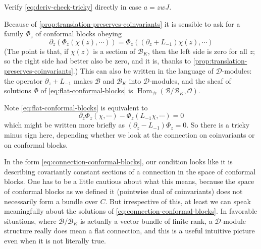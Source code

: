 \documentclass[12pt,letterpaper,reqno]{amsart}
\newcommand{\added}[1]{{\color{addedcolor}#1}}
\numberwithin{equation}{section}
\newcommand{\cD}{\ensuremath{\mathcal D}}
\newcommand{\cB}{\ensuremath{\mathcal B}}
\newcommand{\cO}{\ensuremath{\mathcal O}}
\DeclareMathOperator{\Hom}{Hom}
\begin{document}
\begin{exercise}
Verify \eqref{eq:deriv-check-tricky} directly
in case $a = z w J$.
\end{exercise}

Because of \autoref{prop:translation-preserves-coinvariants} 
it is sensible to ask for a family $\Phi_z$ of conformal blocks obeying
\begin{equation} \label{eq:flat-conformal-blocks}
  \partial_z (\Phi_z(\chi(z), \cdots)) = \Phi_z((\partial_z + L_{-1}) \chi(z), \cdots)
\end{equation}
(The point is that, if $\chi(z)$ is a section of $\cB_K$, then the left side is zero for all $z$; so the right 
side had better also be zero, and it is, thanks to \autoref{prop:translation-preserves-coinvariants}.)
This can also be written in the language of $\cD$-modules:
the operator $\partial_z + L_{-1}$ makes $\cB$ and $\cB_K$ into $\cD$-modules,
and the sheaf of solutions $\Phi$ of \eqref{eq:flat-conformal-blocks} is
$\Hom_{\cD}(\cB / \cB_K, \cO)$.

Note \eqref{eq:flat-conformal-blocks} is equivalent to
\begin{equation} \label{eq:connection-conformal-blocks}
  \partial_z \Phi_z(\chi, \cdots) - \Phi_z(L_{-1} \chi, \cdots) = 0
\end{equation}
which might be written more briefly as $(\partial_z - L_{-1}) \Phi_z = 0$.
So there is a tricky minus sign here, depending whether we look at the
connection on coinvariants or on conformal blocks.

In the form \eqref{eq:connection-conformal-blocks}, our condition looks like it is describing
covariantly constant sections of a connection in the space of conformal blocks.
One has to be a little cautious about what this means, because the space of conformal blocks as we defined it
(pointwise dual of coinvariants) does not necessarily form a bundle over $C$.
But irrespective of this, at least we can speak meaningfully about the solutions 
of \eqref{eq:connection-conformal-blocks}.
In favorable situations, where $\cB / \cB_K$ is actually a vector bundle of finite rank, a $\cD$-module 
structure really does mean a flat connection, and this is a useful intuitive picture even when it is not
literally true.
\end{document}
